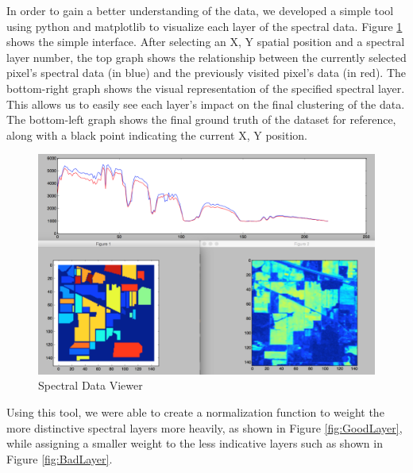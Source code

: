 \documentclass[journal]{IEEEtran}
\begin{document}
    In order to gain a better understanding of the data, we developed a simple tool using python and matplotlib to visualize each layer of the spectral data. Figure \ref{fig:Viewer} shows the simple interface.  After selecting an X, Y spatial position and a spectral layer number, the top graph shows the relationship between the currently selected pixel’s spectral data (in blue) and the previously visited pixel’s data (in red). The bottom-right graph shows the visual representation of the specified spectral layer. This allows us to easily see each layer’s impact on the final clustering of the data. The bottom-left graph shows the final ground truth of the dataset for reference, along with a black point indicating the current X, Y position.\\

    \begin{figure}[h!]
      \centering\includegraphics[width=\columnwidth]{images/tool.png}
      \caption{Spectral Data Viewer}
      \label{fig:Viewer}
    \end{figure}

    Using this tool, we were able to create a normalization function to weight the more distinctive spectral layers more heavily, as shown in Figure \ref{fig:GoodLayer}, while assigning a smaller weight to the less indicative layers such as shown in Figure \ref{fig:BadLayer}.\\
\end{document}
